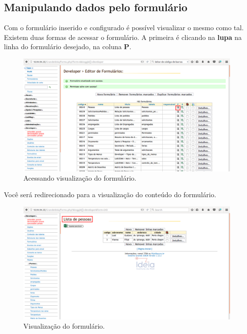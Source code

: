 \documentclass[9pt]{report}
\begin{document}
{      \subsection{Manipulando dados pelo formulário}

      Com o formulário inserido e
      configurado é possível visualizar o mesmo como tal. Existem
      duas formas de acessar o formulário. A primeira é clicando na
      \textbf{lupa} na linha do formulário desejado, na coluna
      \textbf{P}.

      \begin{figure}[H]
        \includegraphics[width=\textwidth]{2_Formularios/2_Criacao_de_formularios/12.png}
        \caption{Acessando visualização do formulário.}
        \label{fig:preview}
      \end{figure}

      Você será redirecionado para a visualização do conteúdo do
      formulário.
           
      \begin{figure}[H]
        \includegraphics[width=\textwidth]{2_Formularios/2_Criacao_de_formularios/13.png}
        \caption{Visualização do formulário.}
        \label{fig:visualizacao}
      \end{figure}

}
\end{document}
